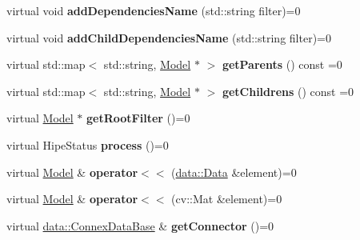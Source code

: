 \begin{DoxyCompactItemize}
virtual void {\bfseries add\+Dependencies\+Name} (std\+::string filter)=0
\item 
\mbox{\label{classfilter_1_1_model_a653e62cfb875ee03d4795787de5f5c0b}} 
virtual void {\bfseries add\+Child\+Dependencies\+Name} (std\+::string filter)=0
\item 
\mbox{\label{classfilter_1_1_model_a7c549c1ddfdfdf745be2b8af436cfd8e}} 
virtual std\+::map$<$ std\+::string, \hyperlink{classfilter_1_1_model}{Model} $\ast$ $>$ {\bfseries get\+Parents} () const =0
\item 
\mbox{\label{classfilter_1_1_model_ae1c2b299634759f1f7a737dc4cd1d8c8}} 
virtual std\+::map$<$ std\+::string, \hyperlink{classfilter_1_1_model}{Model} $\ast$ $>$ {\bfseries get\+Childrens} () const =0
\item 
\mbox{\label{classfilter_1_1_model_a90641dc0938876076bc168db55c39329}} 
virtual \hyperlink{classfilter_1_1_model}{Model} $\ast$ {\bfseries get\+Root\+Filter} ()=0
\item 
\mbox{\label{classfilter_1_1_model_abbcca911eee1d784223c170adbb6434c}} 
virtual Hipe\+Status {\bfseries process} ()=0
\item 
\mbox{\label{classfilter_1_1_model_adee4dae4696f6b7f79af9d5c50d31ec0}} 
virtual \hyperlink{classfilter_1_1_model}{Model} \& {\bfseries operator$<$$<$} (\hyperlink{classfilter_1_1data_1_1_data}{data\+::\+Data} \&element)=0
\item 
\mbox{\label{classfilter_1_1_model_ae934716132893f4881ff430255e39d51}} 
virtual \hyperlink{classfilter_1_1_model}{Model} \& {\bfseries operator$<$$<$} (cv\+::\+Mat \&element)=0
\item 
\mbox{\label{classfilter_1_1_model_a1aebdbd61f6f1d6ea9924008cfa7ba43}} 
virtual \hyperlink{classfilter_1_1data_1_1_connex_data_base}{data\+::\+Connex\+Data\+Base} \& {\bfseries get\+Connector} ()=0
\end{DoxyCompactItemize}
